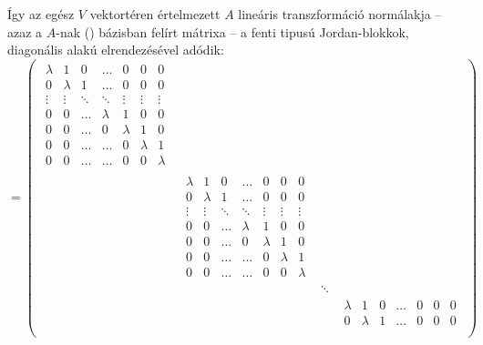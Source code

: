 \documentclass[a4paper, showtrims]{memoir}
\theoremstyle{plain}
\theoremstyle{remark}
\theoremstyle{definition}
\begin{document}
Így az egész $V$ vektortéren értelmezett $A$ lineáris transzformáció normálakja
--
azaz a $A$-nak (\dag) bázisban felírt mátrixa
--
a fenti tipusú Jordan-blokkok, diagonális alakú elrendezésével adódik:
\begin{displaymath}
	[A]=
	\begin{pmatrix}
		\begin{matrix}
			\lambda & 1       & 0      & \dots   & 0       & 0       & 0       \\
			0       & \lambda & 1      & \dots   & 0       & 0       & 0       \\
			\vdots  & \vdots  & \ddots & \ddots  & \vdots  & \vdots  & \vdots  \\
			0       & 0       & \dots  & \lambda & 1       & 0       & 0       \\
			0       & 0       & \dots  & 0       & \lambda & 1       & 0       \\
			0       & 0       & \dots  & \dots   & 0       & \lambda & 1       \\
			0       & 0       & \dots  & \dots   & 0       & 0       & \lambda
		\end{matrix} &        &        & \\
		                                & \!\!\!
		\begin{matrix}
			\lambda & 1       & 0      & \dots   & 0       & 0       & 0       \\
			0       & \lambda & 1      & \dots   & 0       & 0       & 0       \\
			\vdots  & \vdots  & \ddots & \ddots  & \vdots  & \vdots  & \vdots  \\
			0       & 0       & \dots  & \lambda & 1       & 0       & 0       \\
			0       & 0       & \dots  & 0       & \lambda & 1       & 0       \\
			0       & 0       & \dots  & \dots   & 0       & \lambda & 1       \\
			0       & 0       & \dots  & \dots   & 0       & 0       & \lambda
		\end{matrix}
		                                &        &          \\
		                                &        & \ddots & \\
		                                &        &        &
		\begin{matrix}
			\lambda & 1       & 0      & \dots   & 0       & 0       & 0       \\
			0       & \lambda & 1      & \dots   & 0       & 0       & 0       \\

\end{matrix}
\end{pmatrix}
\end{displaymath}
\end{document}
